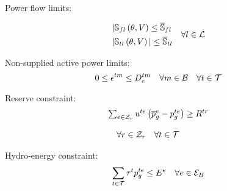 Power flow limits:

\begin{equation}
\begin{aligned}
&|\mathbb{S}_{fl}\left(\theta,V\right) \le \overline{\mathbb{S}}_{fl}\\
&|\mathbb{S}_{tl}\left(\theta,V\right)| \le \overline{\mathbb{S}}_{tl}\\
\end{aligned} 
\quad \forall l \in {\cal{L}}
\label{power_lims}
\end{equation}

Non-supplied active power limits:
\begin{equation}
0 \le \epsilon^{tm} \le D^{tm}_{e} \quad \forall m \in {\cal{B}} \quad \forall t  \in {\cal{T}}  
\label{nsd_limits}
\end{equation}

Reserve constraint:
\begin{equation}
\begin{array}{l}
\sum_{e \in {\cal{Z}}_{r}}{u^{te} \left( \overline{p}_{g}^{e} - p_{g}^{te} \right)} \ge R^{tr}\\
{}\\
 \quad \forall r \in {\cal{Z}}_{r} \quad \forall t  \in {\cal{T}}
\end{array}
\label{reserve}
\end{equation}

Hydro-energy constraint:
\begin{equation}
\sum_{t \in {\cal{T}}}{{\tau}^{t} p_{g}^{te}} \le E^{e} \quad \forall e \in {\cal{E}}_{H}
\label{hidro_energy}
\end{equation}

\newpage